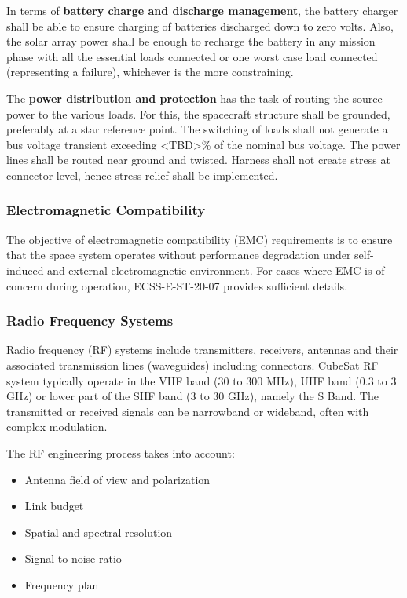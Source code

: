 In terms of \textbf{battery charge and discharge management}, the battery charger shall be able to ensure charging of batteries discharged down to zero volts. Also, the solar array power shall be enough to recharge the battery in any mission phase with all the essential loads connected or one worst case load connected (representing a failure), whichever is the more constraining.

The \textbf{power distribution and protection} has the task of routing the source power to the various loads. For this, the spacecraft structure shall be grounded, preferably at a star reference point. The switching of loads shall not generate a bus voltage transient exceeding <TBD>\% of the nominal bus voltage. The power lines shall be routed near ground and twisted. Harness shall not create stress at connector level, hence stress relief shall be implemented.

\subsubsection{Electromagnetic Compatibility}

The objective of electromagnetic compatibility (EMC) requirements is to ensure that the space system operates without performance degradation under self-induced and external electromagnetic environment. For cases where EMC is of concern during operation, ECSS-E-ST-20-07 \cite{ECSS-E-ST-20-07} provides sufficient details.

\subsubsection{Radio Frequency Systems}

Radio frequency (RF) systems include transmitters, receivers, antennas and their  associated transmission lines (waveguides) including connectors. CubeSat RF system typically operate in the VHF band (30 to 300 MHz), UHF band (0.3 to 3 GHz) or lower part of the SHF band (3 to 30 GHz), namely the S Band. The transmitted or received signals can be narrowband or wideband, often with complex modulation. 

The RF engineering process takes into account:

\begin{itemize}
\item Antenna field of view and polarization
\item Link budget
\item Spatial and spectral resolution
\item Signal to noise ratio
\item Frequency plan
\end{itemize}

